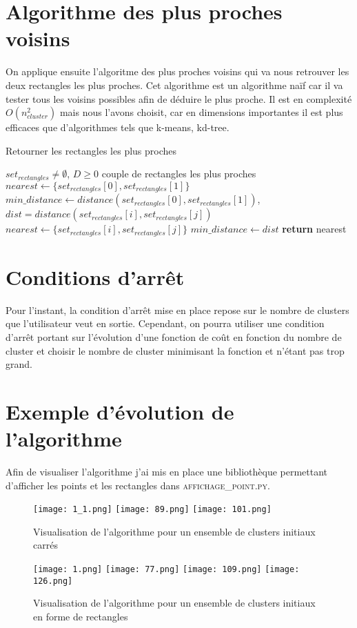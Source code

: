 \documentclass[a4paper,english,titlepage]{article}
\begin{document}
	\section{Algorithme des plus proches voisins}
	On applique ensuite l'algoritme des plus proches voisins qui va nous retrouver les deux rectangles les plus proches. 
	Cet algorithme est un algorithme naïf car il va tester tous les voisins possibles afin de déduire le plus proche. 
	Il est en complexité $O(n_{cluster}^{2})$ mais nous l'avons choisit, car en dimensions importantes il est plus efficaces que d'algorithmes tels que k-means, kd-tree.
		\begin{algorithm}
		\caption{Retourner les rectangles les plus proches}
		\begin{algorithmic}
			\REQUIRE $set_{rectangles} \neq \emptyset$,  $D \geq 0$
		\ENSURE couple de rectangles les plus proches
		\STATE $nearest \leftarrow \{set_{rectangles}[0], set_{rectangles}[1]\}$
		\STATE $min\_distance \leftarrow distance(set_{rectangles}[0], set_{rectangles}[1])$,
		\STATE $dist = distance(set_{rectangles}[i], set_{rectangles}[j])$
		\STATE $nearest \leftarrow \{set_{rectangles}[i], set_{rectangles}[j]\}$
		\STATE $min\_distance \leftarrow dist$
		\ENDIF
		\ENDFOR
		\ENDFOR
		\STATE \textbf{return} nearest
	\end{algorithmic}
	\end{algorithm}


	\section{Conditions d'arrêt}
Pour l'instant, la condition d'arrêt mise en place repose sur le nombre de clusters que l'utilisateur veut en sortie. 
Cependant, on pourra utiliser une condition d'arrêt portant sur l'évolution d'une fonction de coût en fonction du nombre de cluster et choisir le nombre de cluster minimisant la fonction et n'étant pas trop grand. 
  
	\section{Exemple d'évolution de l'algorithme}  
Afin de visualiser l'algorithme j'ai mis en place une bibliothèque permettant d'afficher les points et les rectangles dans \textsc{affichage\_point.py}.
  	
\begin{figure}[h!]
		\texttt{[image: 1\_1.png]}
		\texttt{[image: 89.png]}
		\texttt{[image: 101.png]}
		\caption{Visualisation de l'algorithme pour un ensemble de clusters initiaux carrés}
 	\end{figure}
  	\begin{figure}[h!]
		\texttt{[image: 1.png]}
		\texttt{[image: 77.png]}
		\texttt{[image: 109.png]}
		\texttt{[image: 126.png]}	
	\caption{Visualisation de l'algorithme pour un ensemble de clusters initiaux en forme de rectangles}
	\label{evo_algo}
	\end{figure}
\end{document}
